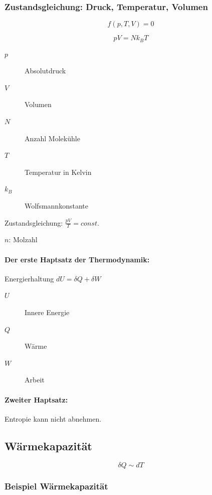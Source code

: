 \documentclass[a4paper]{scrartcl}
\begin{document}
\subsubsection{Zustandsgleichung: Druck, Temperatur, Volumen}


\[
	f(p, T, V) = 0
\]



\[
p V = N k_B T
\]


\begin{description}
	\item[$p$] Absolutdruck
	\item[$V$] Volumen	
	\item[$N$] Anzahl Molekühle
	\item[$T$] Temperatur in Kelvin
	\item[$k_B$] Wolfsmannkonstante
\end{description}

Zustandsgleichung: $\frac{pV}{T} = const.$



$n$: Molzahl





\paragraph{Der erste Haptsatz der Thermodynamik:}

Energierhaltung $dU = \delta Q + \delta W$

\begin{description}
	\item[$U$] Innere Energie
	\item[$Q$] Wärme
	\item[$W$] Arbeit
\end{description}

\paragraph{Zweiter Haptsatz:}

Entropie kann nicht abnehmen.

\subsection{Wärmekapazität}

\[
	\delta Q \sim dT
\]

\subsubsection{Beispiel Wärmekapazität}
\end{document}
